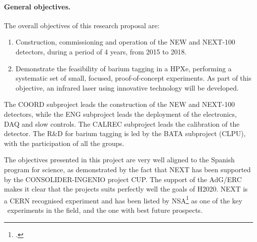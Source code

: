 \paragraph{General objectives.}
The overall objectives of this research proposal are:

\begin{enumerate}
\item Construction, commissioning and operation of the NEW and NEXT-100 detectors, during a period of 4 years, from 2015 to 2018.
\item Demonstrate the feasibility of barium tagging in a HPXe, performing a systematic set of small, focused, proof-of-concept experiments. As part of this objective, an infrared laser using innovative technology will be developed. 
\end{enumerate}
  
The COORD subproject leads the construction of the NEW and NEXT-100 detectors, while the ENG subproject leads the deployment of the electronics, DAQ and slow controls. The CALREC subproject leads the calibration of the detector. The R\&D for barium tagging is led by the BATA subproject (CLPU), with the participation of all the groups.   

The objectives presented in this project are very well aligned to the Spanish program for science, as demonstrated by the fact that NEXT has been supported by the CONSOLIDER-INGENIO project CUP. The support of the AdG/ERC makes it clear that the projects suits perfectly well the goals of H2020. NEXT is a CERN recognised experiment and has been listed by NSA\footcite{NLDBD} as one of the key \bbonu\ experiments in the field, and the one with best future prospects.




